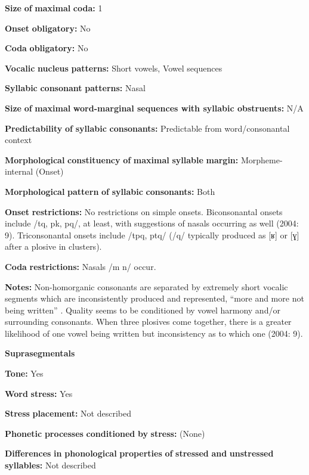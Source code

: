 \textbf{Size} \textbf{of} \textbf{maximal} \textbf{coda:} 1

\textbf{Onset} \textbf{obligatory:} No

\textbf{Coda} \textbf{obligatory:} No

\textbf{Vocalic} \textbf{nucleus} \textbf{patterns:} Short vowels, Vowel sequences

\textbf{Syllabic} \textbf{consonant} \textbf{patterns:} Nasal

\textbf{Size} \textbf{of} \textbf{maximal} \textbf{word{}-marginal sequences with syllabic obstruents:} N/A

\textbf{Predictability} \textbf{of} \textbf{syllabic} \textbf{consonants:} Predictable from word/consonantal context

\textbf{Morphological} \textbf{constituency} \textbf{of} \textbf{maximal} \textbf{syllable} \textbf{margin:} Morpheme-internal (Onset)

\textbf{Morphological} \textbf{pattern} \textbf{of} \textbf{syllabic} \textbf{consonants:} Both

\textbf{Onset} \textbf{restrictions:} No restrictions on simple onsets. Biconsonantal onsets include /tq, pk, pq/, at least, with suggestions of nasals occurring as well (2004: 9). Triconsonantal onsets include /tpq, ptq/ (/q/ typically produced as [ʁ] or [ɣ] after a plosive in clusters). 

\textbf{Coda} \textbf{restrictions:} Nasals /m n/ occur.

\textbf{Notes:} Non-homorganic consonants are separated by extremely short vocalic segments which are inconsistently produced and represented, “more and more not being written” \citep[226]{Whitehead2004}. Quality seems to be conditioned by vowel harmony and/or surrounding consonants. When three plosives come together, there is a greater likelihood of one vowel being written but inconsistency as to which one (2004: 9).

\textbf{Suprasegmentals}

\textbf{Tone:} Yes

\textbf{Word} \textbf{stress:} Yes

\textbf{Stress} \textbf{placement:} Not described

\textbf{Phonetic} \textbf{processes} \textbf{conditioned} \textbf{by} \textbf{stress:} (None)

\textbf{Differences} \textbf{in} \textbf{phonological} \textbf{properties} \textbf{of} \textbf{stressed} \textbf{and} \textbf{unstressed} \textbf{syllables:} Not described


